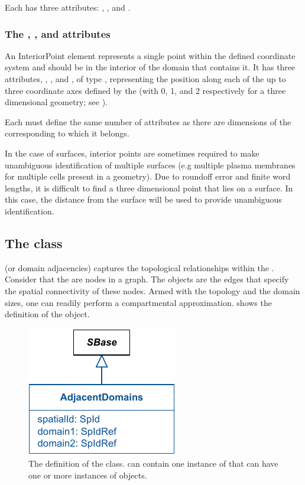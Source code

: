 Each \InteriorPoint has three attributes: , , and . 

\subsubsection{The , , and  attributes}
An InteriorPoint element represents a single point within the defined coordinate system and should be in the interior of the domain that contains it. It has three attributes, , , and , of type , representing the position along each of the up to three coordinate axes defined by the \CoordinateComponents (with  0, 1, and 2 respectively for a three dimensional geometry; see ).

Each \InteriorPoint must define the same number of attributes as there are dimensions of the corresponding \Geometry to which it belongs.

In the case of surfaces, interior points are sometimes required to make unambiguous identification of multiple surfaces (e.g multiple plasma membranes for multiple cells present in a geometry).  Due to roundoff error and finite word lengths, it is difficult to find a three dimensional point that lies on a surface.  In this case, the distance from the surface will be used to provide unambiguous identification.


\subsection{The  class}
\label{AdjacentDomains-class}
\AdjacentDomains (or domain adjacencies) captures the topological relationships within the \Geometry.  Consider that the \Domains are nodes in a graph. The \AdjacentDomains objects are the edges that specify the spatial connectivity of these nodes.  Armed with the topology and the domain sizes, one can readily perform a compartmental approximation.   shows the definition of the \AdjacentDomains object.

\begin{figure}[ht]
  \includegraphics{figs/AdjacentDomains-uml}
  \caption{The definition of the \AdjacentDomains class. \Geometry can contain one instance of \ListOfAdjacentDomains that can have one or more instances of \AdjacentDomains objects.}
  \label{AdjacentDomains-uml}
\end{figure}

